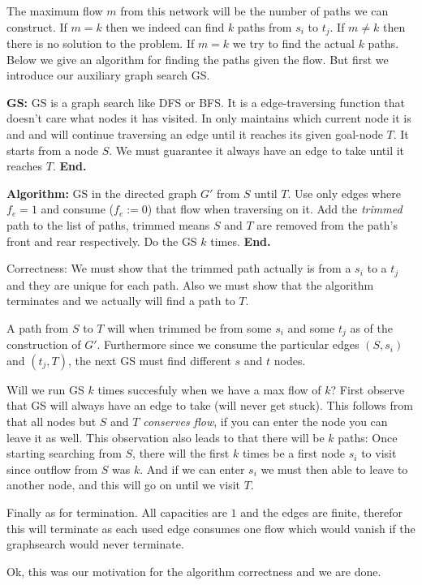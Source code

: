 \documentclass[a4paper,11pt]{article}
\begin{document}
The maximum flow $m$ from this network will be the number
of paths we can construct. If $m=k$ then we indeed can
find $k$ paths from $s_i$ to $t_j$.
If $m \neq k$ then there is no solution to the problem.
If $m=k$ we try to find the actual $k$ paths.
Below we give an algorithm for finding the paths given the
flow. But first we introduce our auxiliary graph search GS.

\textbf{GS: }
GS is a graph search like DFS or BFS. It is a edge-traversing
function that doesn't care what nodes it has visited.
In only maintains which current node it is and and will
continue traversing an edge until it reaches its given goal-node $T$.
It starts from a node $S$.
We must guarantee it always have an edge to take until it
reaches $T$.
\textbf{End.}

\textbf{Algorithm: }
GS in the directed graph $G'$ from $S$ until $T$.
Use only edges where
$f_e=1$ and consume ($f_e:=0$) that flow when traversing on it.
Add the \emph{trimmed} path to the list of paths,
trimmed means $S$ and $T$ are removed from the path's
front and rear respectively.
Do the GS $k$ times.
\textbf{End.}

Correctness: We must show that the trimmed path actually is from
a $s_i$ to a $t_j$ and they are unique for each path.
Also we must show that the algorithm terminates and we actually
will find a path to $T$.

A path from $S$ to $T$
will when trimmed be from some $s_i$ and some $t_j$
as of the construction of $G'$.
Furthermore since we consume the particular edges
$(S, s_i)$ and $(t_j, T)$, the next GS must find
different $s$ and $t$ nodes.

Will we run GS $k$ times succesfuly when we have a max flow of $k$?
First observe that GS will always have an edge to take (will never get stuck).
This follows from that all nodes
but $S$ and $T$ \emph{conserves flow}, if you can enter
the node you can leave it as well. This observation also leads to
that there will be $k$ paths:
Once starting searching from $S$, there will the first $k$ times
be a first node $s_i$ to visit since outflow from $S$ was $k$.
And if we can enter $s_i$ we must then able to leave to another
node, and this will go on until we visit $T$.

Finally as for termination. All capacities are $1$ and the
edges are finite, therefor this will terminate as each used edge
consumes one flow which would vanish if the graphsearch would
never terminate.

Ok, this was our motivation for the algorithm correctness and we are done.

\end{document}
